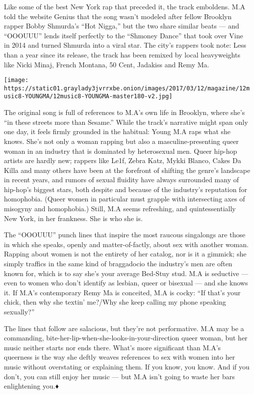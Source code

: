 Like some of the best New York rap that preceded it, the track
emboldens. M.A told the website Genius that the song wasn't modeled
after fellow Brooklyn rapper Bobby Shmurda's ``Hot Nigga,'' but the two
share similar beats --- and ``OOOUUU'' lends itself perfectly to the
``Shmoney Dance'' that took over Vine in 2014 and turned Shmurda into a
viral star. The city's rappers took note: Less than a year since its
release, the track has been remixed by local heavyweights like Nicki
Minaj, French Montana, 50 Cent, Jadakiss and Remy Ma.

\texttt{[image: https://static01.graylady3jvrrxbe.onion/images/2017/03/12/magazine/12music8-YOUNGMA/12music8-YOUNGMA-master180-v2.jpg]}

The original song is full of references to M.A's own life in Brooklyn,
where she's ``in these streets more than Sesame.'' While the track's
narrative might span only one day, it feels firmly grounded in the
habitual: Young M.A raps what she knows. She's not only a woman rapping
but also a masculine-presenting queer woman in an industry that is
dominated by heterosexual men. Queer hip-hop artists are hardly new;
rappers like Le1f, Zebra Katz, Mykki Blanco, Cakes Da Killa and many
others have been at the forefront of shifting the genre's landscape in
recent years, and rumors of sexual fluidity have always surrounded many
of hip-hop's biggest stars, both despite and because of the industry's
reputation for homophobia. (Queer women in particular must grapple with
intersecting axes of misogyny and homophobia.) Still, M.A seems
refreshing, and quintessentially New York, in her frankness. She is who
she is.

The ``OOOUUU'' punch lines that inspire the most raucous singalongs are
those in which she speaks, openly and matter-of-factly, about sex with
another woman. Rapping about women is not the entirety of her catalog,
nor is it a gimmick; she simply traffics in the same kind of braggadocio
the industry's men are often known for, which is to say she's your
average Bed-Stuy stud. M.A is seductive --- even to women who don't
identify as lesbian, queer or bisexual --- and she knows it. If M.A's
contemporary Remy Ma is conceited, M.A is cocky: ``If that's your chick,
then why she textin' me?/Why she keep calling my phone speaking
sexually?''

The lines that follow are salacious, but they're not performative. M.A
may be a commanding, bite-her-lip-when-she-looks-in-your-direction queer
woman, but her music neither starts nor ends there. What's more
significant than M.A's queerness is the way she deftly weaves references
to sex with women into her music without overstating or explaining them.
If you know, you know. And if you don't, you can still enjoy her music
--- but M.A isn't going to waste her bars enlightening you.♦

